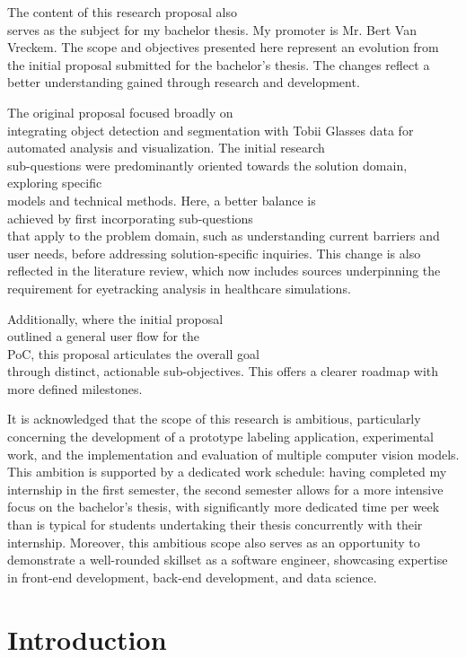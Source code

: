 \documentclass[english]{hogent-article}
\begin{document}
The content of this research proposal also\\ serves as the subject for my bachelor thesis. 
My promoter is Mr. Bert Van Vreckem. The scope and objectives presented here represent an evolution from the initial proposal submitted 
for the bachelor's thesis. The changes reflect a better understanding gained through research and development.

The original proposal focused broadly on\\ integrating object detection and segmentation with Tobii Glasses data for automated analysis and visualization.
The initial research\\ sub-questions were predominantly oriented towards the solution domain, exploring specific\\ models and technical methods.
Here, a better balance is\\ achieved by first incorporating sub-questions\\ that apply to the problem domain, 
such as understanding current barriers and user needs, before addressing solution-specific inquiries.
This change is also reflected in the literature review, which now includes sources underpinning the requirement for eyetracking analysis in healthcare simulations.

Additionally, where the initial proposal\\ outlined a general user flow for the\\ PoC,
this proposal articulates the overall goal\\ through distinct, actionable sub-objectives.
This offers a clearer roadmap with more defined milestones.

It is acknowledged that the scope of this research is ambitious, particularly concerning the development of a 
prototype labeling application, experimental work, and the implementation and evaluation of multiple computer vision models.
This ambition is supported by a dedicated work schedule: having completed my internship in the first semester, the second semester allows for a more intensive focus
on the bachelor's thesis, with significantly more dedicated time per week than is typical for students undertaking their thesis concurrently with their internship.
Moreover, this ambitious scope also serves as an opportunity to demonstrate a well-rounded skillset as a software engineer, showcasing expertise in front-end development, back-end development, and data science.

\section{Introduction}
\label{sec:Introduction}
\end{document}
